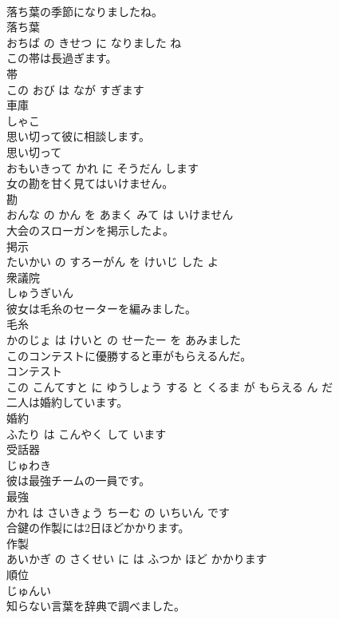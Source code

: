 \documentclass[8pt]{extreport}
\begin{document}
\begin{CJK}{UTF8}{min}
\\	落ち葉の季節になりましたね。	
\\	落ち葉 
\\	おちば の きせつ に なりました ね			
\\	この帯は長過ぎます。	
\\	帯 
\\	この おび は なが すぎます			
\\	車庫	
\\	しゃこ		
\\	思い切って彼に相談します。	
\\	思い切って 
\\	おもいきって かれ に そうだん します			
\\	女の勘を甘く見てはいけません。	
\\	勘 
\\	おんな の かん を あまく みて は いけません			
\\	大会のスローガンを掲示したよ。	
\\	掲示 
\\	たいかい の すろーがん を けいじ した よ			
\\	衆議院	
\\	しゅうぎいん		
\\	彼女は毛糸のセーターを編みました。	
\\	毛糸 
\\	かのじょ は けいと の せーたー を あみました			
\\	このコンテストに優勝すると車がもらえるんだ。	
\\	コンテスト 
\\	この こんてすと に ゆうしょう する と くるま が もらえる ん だ			
\\	二人は婚約しています。	
\\	婚約 
\\	ふたり は こんやく して います			
\\	受話器	
\\	じゅわき		
\\	彼は最強チームの一員です。	
\\	最強 
\\	かれ は さいきょう ちーむ の いちいん です			
\\	合鍵の作製には2日ほどかかります。	
\\	作製 
\\	あいかぎ の さくせい に は ふつか ほど かかります			
\\	順位	
\\	じゅんい		
\\	知らない言葉を辞典で調べました。	

\end{CJK}
\end{document}
